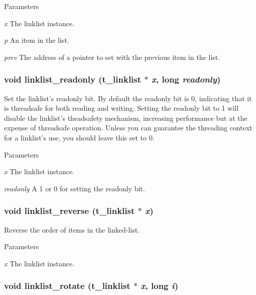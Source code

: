 \begin{DoxyParams}{Parameters}
\item[{\em x}]The linklist instance. \item[{\em p}]An item in the list. \item[{\em prev}]The address of a pointer to set with the previous item in the list. \end{DoxyParams}
\hypertarget{group__linklist_ga95d07cfad7f3a651b1d42482183cd698}{
\subsubsection[{linklist\_\-readonly}]{\setlength{\rightskip}{0pt plus 5cm}void linklist\_\-readonly ({\bf t\_\-linklist} $\ast$ {\em x}, \/  long {\em readonly})}}
\label{group__linklist_ga95d07cfad7f3a651b1d42482183cd698}


Set the linklist's readonly bit. By default the readonly bit is 0, indicating that it is threadsafe for both reading and writing. Setting the readonly bit to 1 will disable the linklist's theadsafety mechanism, increasing performance but at the expense of threadsafe operation. Unless you can guarantee the threading context for a linklist's use, you should leave this set to 0.


\begin{DoxyParams}{Parameters}
\item[{\em x}]The linklist instance. \item[{\em readonly}]A 1 or 0 for setting the readonly bit. \end{DoxyParams}
\hypertarget{group__linklist_ga4ca32e817270576a9c1137e86f33c3d6}{
\subsubsection[{linklist\_\-reverse}]{\setlength{\rightskip}{0pt plus 5cm}void linklist\_\-reverse ({\bf t\_\-linklist} $\ast$ {\em x})}}
\label{group__linklist_ga4ca32e817270576a9c1137e86f33c3d6}


Reverse the order of items in the linked-\/list. 
\begin{DoxyParams}{Parameters}
\item[{\em x}]The linklist instance. \end{DoxyParams}
\hypertarget{group__linklist_ga728b9e635de257787b721dddaac8e01f}{
\subsubsection[{linklist\_\-rotate}]{\setlength{\rightskip}{0pt plus 5cm}void linklist\_\-rotate ({\bf t\_\-linklist} $\ast$ {\em x}, \/  long {\em i})}}
\label{group__linklist_ga728b9e635de257787b721dddaac8e01f}


